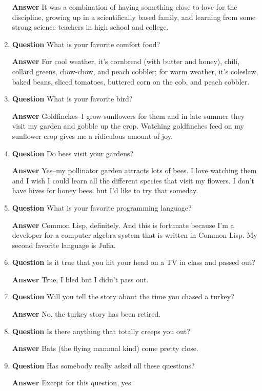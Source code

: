 \documentclass[12pt]{article}
\newcounter{ex}\setcounter{ex}{0}
\newcounter{dy}\setcounter{dy}{0}
\begin{document}
\begin{enumerate}
\textbf{Answer} It was a combination of having something close to love for the discipline, growing up in a scientifically based family, and learning from some strong science teachers in high school and college.


\item  \textbf{Question} What is your favorite comfort food?

  \textbf{Answer}  For cool weather, it's cornbread (with butter and honey), chili, collard greens, chow-chow, and peach cobbler; for warm weather, it's coleslaw, baked beans, sliced tomatoes, buttered corn on the cob, and peach cobbler.

  \item  \textbf{Question}  What is your favorite bird?
  
  \textbf{Answer} Goldfinches--I grow sunflowers for them and in late summer
  they visit my garden and gobble up the crop. Watching goldfinches feed on my sunflower
  crop gives me a 
  ridiculous amount of joy.

  \item  \textbf{Question}  Do bees visit your gardens?
  
  \textbf{Answer} Yes--my pollinator garden attracts lots of bees. I love
  watching them and I wish I could learn all the different
  species that visit my flowers. I don't have hives for honey bees, but
  I'd like to try that someday.

\item   \textbf{Question}  What is your favorite programming language?

 \textbf{Answer}  Common Lisp, definitely. And this is fortunate because I'm a developer for a computer algebra system that is written in Common Lisp. My second favorite language is Julia.

\item   \textbf{Question} Is it true that you hit your head on a TV in class and 
passed out?

  \textbf{Answer} True, I bled but I didn't pass out.

\item   \textbf{Question} Will you tell the story about the time you chased a turkey?

 \textbf{Answer} No, the turkey story has been retired.


\item   \textbf{Question} Is there anything that totally creeps you out?

\textbf{Answer} Bats (the flying mammal kind) come pretty close.

\item \textbf{Question} Has somebody really asked all these questions?

\textbf{Answer}  Except for  this question, yes.
\end{enumerate}
\end{document}
